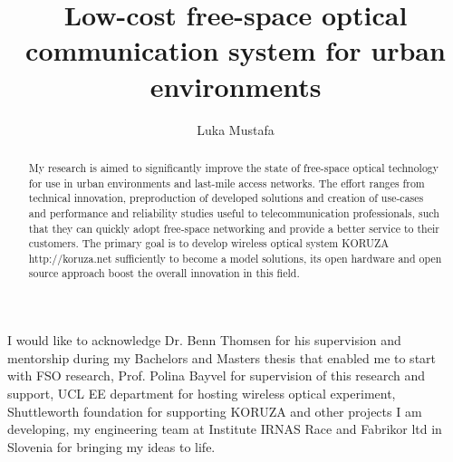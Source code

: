
\title{Low-cost free-space optical communication system for urban environments}
\author{Luka Mustafa}

\maketitle
\makedeclaration

\begin{abstract} %
My research is aimed to significantly improve the state of free-space optical technology for use in urban environments and last-mile access networks. The effort ranges from technical innovation, preproduction of developed solutions and creation of use-cases and performance and reliability studies useful to telecommunication professionals, such that they can quickly adopt free-space networking and provide a better service to their customers. The primary goal is to develop wireless optical system KORUZA http://koruza.net sufficiently to become a model solutions, its open hardware and open source approach boost the overall innovation in this field.
\end{abstract}

\begin{acknowledgements}
I would like to acknowledge Dr. Benn Thomsen for his supervision and mentorship during my Bachelors and Masters thesis that enabled me to start with FSO research, Prof. Polina Bayvel for supervision of this research and support, UCL EE department for hosting wireless optical experiment, Shuttleworth foundation for supporting KORUZA and other projects I am developing, my engineering team at Institute IRNAS Race and Fabrikor ltd in Slovenia for bringing my ideas to life.
\end{acknowledgements}

\setcounter{tocdepth}{2}

\tableofcontents
\listoffigures
\listoftables
